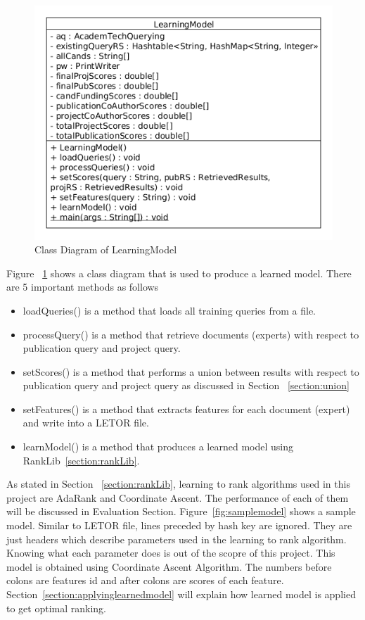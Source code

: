 \begin{figure}
\centering
\includegraphics[scale=0.7]{./figures/learningModel.png}
\caption{Class Diagram of LearningModel} \label{fig:learningmodel} 
\end{figure}

Figure ~\ref{fig:learningmodel} shows a class diagram that is used to produce a learned model. There are 5 important methods as follows
\begin{itemize}
 \item loadQueries() is a method that loads all training queries from a file.
 \item processQuery() is a method that retrieve documents (experts) with respect to publication query and project query.
 \item setScores() is a method that performs a union between results with respect to publication query and project query as discussed in Section ~\ref{section:union}
 \item setFeatures() is a method that extracts features for each document (expert) and write into a LETOR file.
 \item learnModel() is a method that produces a learned model using RankLib~\ref{section:rankLib}.
\end{itemize}

As stated in Section ~\ref{section:rankLib}, learning to rank algorithms used in this project are AdaRank and Coordinate Ascent. The performance of each
of them will be discussed in Evaluation Section. Figure~\ref{fig:samplemodel} shows a sample model. Similar to LETOR file, lines preceded by hash key are
ignored. They are just headers which describe parameters used in the learning to rank algorithm. Knowing what each parameter does is out of the scopre of 
this project. This model is obtained using Coordinate Ascent Algorithm. The numbers before colons are features id and after colons are scores of each 
feature. Section~\ref{section:applyinglearnedmodel} will explain how learned model is applied to get optimal ranking.

